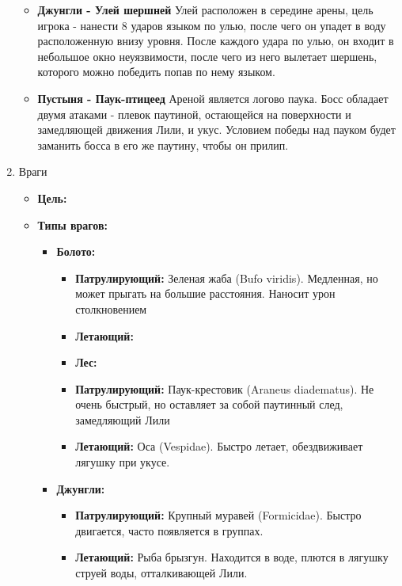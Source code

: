 \documentclass{article}
\begin{document}
\begin{enumerate}
\begin{itemize}
     \item \textbf{Джунгли - Улей шершней} Улей расположен в середине арены, цель игрока - нанести 8 ударов языком по улью, после чего он упадет в воду расположенную внизу уровня. После каждого удара по улью, он входит в небольшое окно неуязвимости, после чего из него вылетает шершень, которого можно победить попав по нему языком.
     \item \textbf{Пустыня - Паук-птицеед} Ареной является логово паука. Босс обладает двумя атаками - плевок паутиной, остающейся на поверхности и замедляющей движения Лили, и укус. Условием победы над пауком будет заманить босса в его же паутину, чтобы он прилип.
     \end {itemize}
\item Враги
    \begin{itemize}
    \item \textbf{Цель: }
    \item \textbf{Типы врагов:}
    \begin{itemize}
            \item \textbf{Болото:}
            \begin{itemize}
                \item \textbf{Патрулирующий:} Зеленая жаба (Bufo viridis). Медленная, но может прыгать на большие расстояния. Наносит урон столкновением
                \item \textbf{Летающий:} 
            \item \textbf{Лес:}
            \end {itemize}
            \begin{itemize}
                \item \textbf{Патрулирующий:} Паук-крестовик (Araneus diadematus). Не очень быстрый, но оставляет за собой паутинный след, замедляющий Лили
                \item \textbf{Летающий:} Оса (Vespidae). Быстро летает, обездвиживает лягушку при укусе.
            \end {itemize}
            \item \textbf{Джунгли:}
            \begin{itemize}
                \item \textbf{Патрулирующий:} Крупный муравей (Formicidae). Быстро двигается, часто появляется в группах.
                \item \textbf{Летающий:} Рыба брызгун. Находится в воде, плются в лягушку струей воды, отталкивающей Лили.

\end{itemize}
\end{itemize}
\end{itemize}
\end{enumerate}
\end{document}
